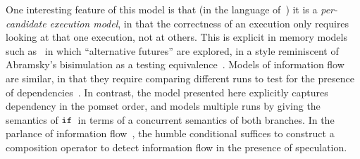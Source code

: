 One interesting feature of this model is that (in the language
of~\cite{Pichon-Pharabod:2016:CSR:2837614.2837616}) it is a
\emph{per-candidate execution model}, in that the correctness of an
execution only requires looking at that one execution, not at
others. This is explicit in memory models such
as~\cite{Jagadeesan:2010:GOS:2175486.2175503,Kang:2017:PSR:3009837.3009850} in which
``alternative futures'' are explored, in a style reminiscent of
Abramsky's bisimulation as a testing equivalence~\cite{ABRAMSKY1987225}. Models of
information flow are similar, in that they require comparing different
runs to test for the presence of dependencies~\cite{Clarkson:2010:HYP:1891823.1891830}. In contrast, the model
presented here explicitly captures dependency in the pomset order, and
models multiple runs by giving the semantics of $\texttt{if}\,$ in terms of a
concurrent semantics of both branches.
In the parlance of information flow~\cite{Barthe:2004:SIF:1009380.1009669},
the humble conditional suffices to construct a composition operator to detect information flow  in the presence of speculation.
